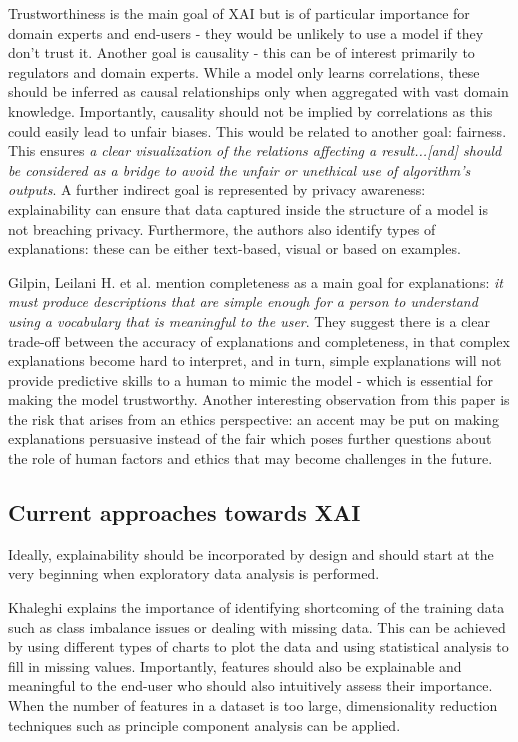 \documentclass[proposal]{softeng}
\begin{document}
Trustworthiness is the main goal of XAI but is of particular importance for domain experts and end-users - they would be unlikely to use a model if they don't trust it. Another goal is causality - this can be of interest primarily to regulators and domain experts. While a model only learns correlations, these should be inferred as causal relationships only when aggregated with vast domain knowledge. Importantly, causality should not be implied by correlations as this could easily lead to unfair biases. This would be related to another goal: fairness. This ensures \textit{a clear visualization of the relations affecting a result...[and] should be considered as a bridge to avoid the unfair or unethical use of algorithm's outputs}. A further indirect goal is represented by privacy awareness: explainability can ensure that data captured inside the structure of a model is not breaching privacy. Furthermore, the authors also identify types of explanations: these can be either text-based, visual or based on examples.

Gilpin, Leilani H. et al.\cite{GilpinLeilaniH} mention completeness as a main goal for explanations: \textit{it must produce descriptions that are simple enough for a person to understand using a vocabulary that is meaningful to the user}. They suggest there is a clear trade-off between the accuracy of explanations and completeness, in that complex explanations become hard to interpret, and in turn, simple explanations will not provide predictive skills to a human to mimic the model - which is essential for making the model trustworthy. Another interesting observation from this paper is the risk that arises from an ethics perspective: an accent may be put on making explanations persuasive instead of the fair which poses further questions about the role of human factors and ethics that may become challenges in the future.

\subsection{Current approaches towards XAI}
Ideally, explainability should be incorporated by design and should start at the very beginning when exploratory data analysis is performed.

Khaleghi \cite{khaleghi} explains the importance of identifying shortcoming of the training data such as class imbalance issues or dealing with missing data. This can be achieved by using different types of charts to plot the data and using statistical analysis to fill in missing values. Importantly, features should also be explainable and meaningful to the end-user who should also intuitively assess their importance. When the number of features in a dataset is too large, dimensionality reduction techniques such as principle component analysis can be applied.
\end{document}
